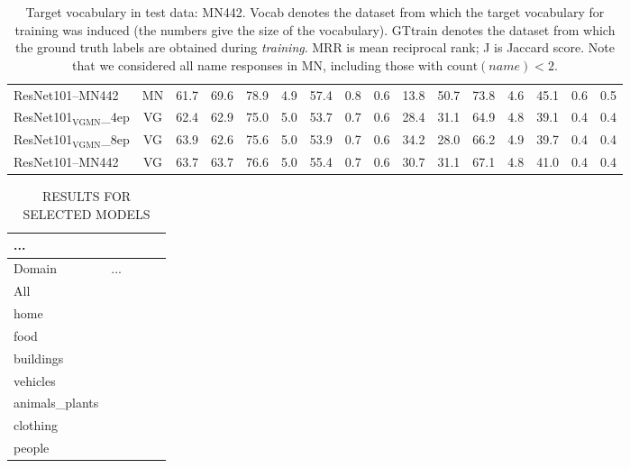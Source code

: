 \begin{table}[t]
\begin{tabular}{l|c|r@{~}r@{~}r@{~}r@{~}r@{~}r@{~}r|@{~}r@{~}r@{~}r@{~}r@{~}r@{~}r@{~}r@{~}}
		ResNet101--MN442 & MN &            61.7 &              69.6 &                78.9 &         4.9 &             57.4 &          0.8 &             0.6 &            13.8 &              50.7 &                73.8 &         4.6 &             45.1 &          0.6 &             0.5 \\
		ResNet101$_{\text{VGMN}}$\_4ep  &   VG &  62.4 &              62.9 &                75.0 &         5.0 &             53.7 &          0.7 &             0.6 &            28.4 &              31.1 &                64.9 &         4.8 &             39.1 &          0.4 &             0.4 \\
		ResNet101$_{\text{VGMN}}$\_8ep & VG &            63.9 &              62.6 &                75.6 &         5.0 &             53.9 &          0.7 &             0.6 &            34.2 &              28.0 &                66.2 &         4.9 &             39.7 &          0.4 &             0.4 \\
		ResNet101--MN442 & VG  &            63.7 &              63.7 &                76.6 &         5.0 &             55.4 &          0.7 &             0.6 &            30.7 &              31.1 &                67.1 &         4.8 &             41.0 &          0.4 &             0.4 \\
		\bottomrule
	\end{tabular}
	\caption{Target vocabulary in test data: MN442. Vocab denotes the dataset from which the target vocabulary for training was induced (the numbers give the size of the vocabulary). GTtrain denotes the dataset from which the ground truth labels are obtained during \textit{training}. MRR is mean reciprocal rank; J is Jaccard score. Note that we considered all name responses in MN, including those with $\text{count}(name)<2$\label{tab:entrylevels}. }
\end{table}


\begin{table}[t]
	\centering
	\small
	\begin{tabular}{l@{~}|rrrr}
		\toprule
		... \\
		\midrule
		Domain	 & ... \\ 
		\midrule
		All           \\
		home           \\
		food           \\
		buildings      \\
		vehicles       \\
		animals\_plants \\
		clothing       \\
		people         \\
		\bottomrule
	\end{tabular}
	\caption{RESULTS FOR SELECTED MODELS \label{tab:domains_bestmodel}}
\end{table}

